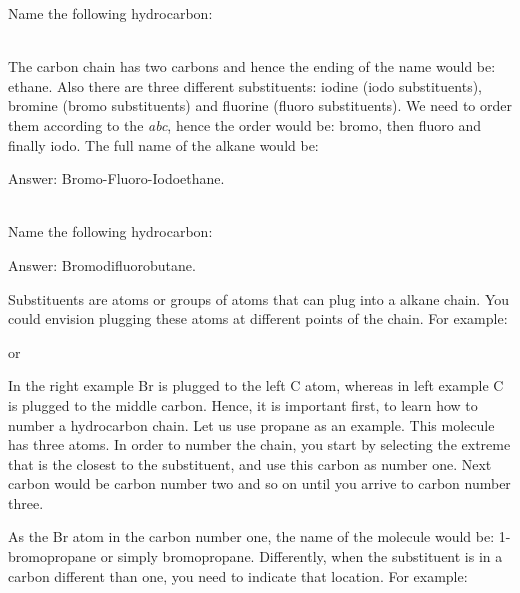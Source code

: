 \documentclass[main.tex]{subfiles}
\newcommand{\mytriangleright}[1]{\tikz{\filldraw[draw=#1,fill=#1] (0,0) --(0em,0.6em) -- (0.4em,0.3em);}}
\begin{document}
\begin{description}
\begin{example} %
Name the following hydrocarbon:
\begin{center} \end{center}
\\
The carbon chain has two carbons and hence the ending of the name would be: ethane. Also there are three different substituents: iodine (iodo substituents), bromine (bromo substituents) and fluorine (fluoro substituents). We need to order them according to the \emph{abc}, hence the order would be: bromo, then fluoro and finally iodo. The full name of the alkane would be: 
\begin{flushright} \mytriangleright{dgreen}\small Answer: Bromo-Fluoro-Iodoethane. \end{flushright}
\faDiamond\ \\
Name the following hydrocarbon:
\begin{center} \end{center}
\begin{flushright} \mytriangleright{dgreen}\small Answer: Bromodifluorobutane. \end{flushright}
\end{example}%


\item[\docfilehook{  Numbering the chain}{Numbering the chain}] Substituents are atoms or groups of atoms that can plug into a alkane chain. You could envision plugging these atoms at different points of the chain. For example:
\begin{center}  \hspace{0.5cm}or\hspace{0.5cm} \end{center}

In the right example Br is plugged to the left C atom, whereas in left example C is plugged to the middle carbon. Hence, it is important first, to learn how to number a hydrocarbon chain. Let us use propane as an example. This molecule has three atoms. In order to number the chain, you start by selecting the extreme that is the closest to the substituent, and use this carbon as number one. Next carbon would be carbon number two and so on until you arrive to carbon number three. 
\begin{center}\end{center}
As the Br atom in the carbon number one, the name of the molecule would be: 1-bromopropane or simply bromopropane. Differently, when the substituent is in a carbon different than one, you need to indicate that location. For example:


\end{description}
\end{document}
